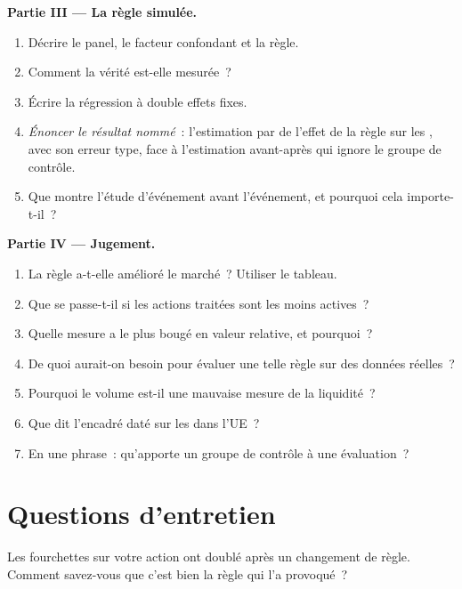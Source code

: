 \begin{problem}
\medskip\noindent\textbf{Partie III --- La règle simulée.}
\begin{enumerate}[resume]
\item Décrire le panel, le facteur confondant et la règle.
\item Comment la vérité est-elle mesurée~?
\item Écrire la régression à double effets fixes.
\item \emph{Énoncer le résultat nommé}~: l'estimation par  de l'effet de la règle sur les , avec son erreur type, face à
l'estimation avant-après qui ignore le groupe de contrôle.
\item Que montre l'étude d'événement avant l'événement, et pourquoi cela importe-t-il~?
\end{enumerate}

\medskip\noindent\textbf{Partie IV --- Jugement.}
\begin{enumerate}[resume]
\item La règle a-t-elle amélioré le marché~? Utiliser le tableau.
\item Que se passe-t-il si les actions traitées sont les moins actives~?
\item Quelle mesure a le plus bougé en valeur relative, et pourquoi~?
\item De quoi aurait-on besoin pour évaluer une telle règle sur des données réelles~?
\item Pourquoi le volume est-il une mauvaise mesure de la liquidité~?
\item Que dit l'encadré daté sur les  dans l'UE~?
\item En une phrase~: qu'apporte un groupe de contrôle à une évaluation~?
\end{enumerate}
\end{problem}

\section{Questions d'entretien}

\begin{interviewq}\label{iq:mx:market-quality-and-regulation:1}
Les fourchettes sur votre action ont doublé après un changement de règle. Comment savez-vous que c'est bien la règle qui l'a provoqué~?
\end{interviewq}

